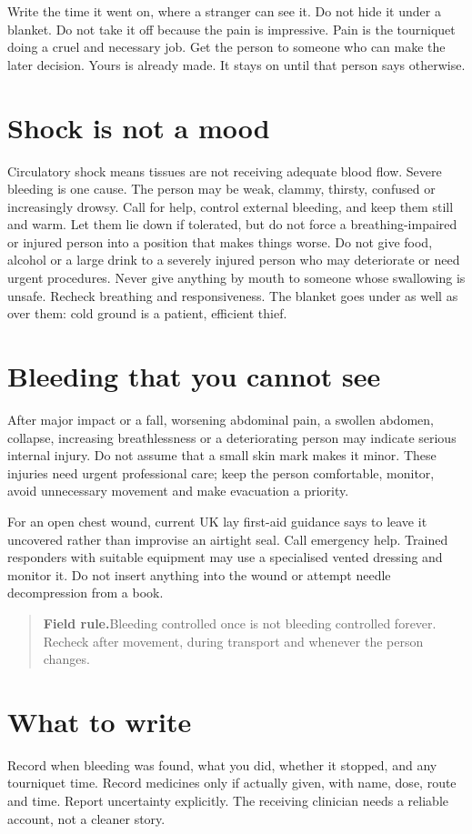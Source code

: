 \documentclass[10pt,openright]{book}
\newcommand{\fieldrule}[1]{\begin{quote}\textbf{Field rule.}\enspace #1\end{quote}}
\begin{document}
Write the time it went on, where a stranger can see it. Do not hide it under a blanket. Do not take it off because the pain is impressive. Pain is the tourniquet doing a cruel and necessary job. Get the person to someone who can make the later decision. Yours is already made. It stays on until that person says otherwise.

\section*{Shock is not a mood}
Circulatory shock means tissues are not receiving adequate blood flow. Severe bleeding is one cause. The person may be weak, clammy, thirsty, confused or increasingly drowsy. Call for help, control external bleeding, and keep them still and warm. Let them lie down if tolerated, but do not force a breathing-impaired or injured person into a position that makes things worse. Do not give food, alcohol or a large drink to a severely injured person who may deteriorate or need urgent procedures. Never give anything by mouth to someone whose swallowing is unsafe. Recheck breathing and responsiveness. The blanket goes under as well as over them: cold ground is a patient, efficient thief.

\section*{Bleeding that you cannot see}
After major impact or a fall, worsening abdominal pain, a swollen abdomen, collapse, increasing breathlessness or a deteriorating person may indicate serious internal injury. Do not assume that a small skin mark makes it minor. These injuries need urgent professional care; keep the person comfortable, monitor, avoid unnecessary movement and make evacuation a priority.

For an open chest wound, current UK lay first-aid guidance says to leave it uncovered rather than improvise an airtight seal. Call emergency help. Trained responders with suitable equipment may use a specialised vented dressing and monitor it. Do not insert anything into the wound or attempt needle decompression from a book.

\fieldrule{Bleeding controlled once is not bleeding controlled forever. Recheck after movement, during transport and whenever the person changes.}
\section*{What to write}
Record when bleeding was found, what you did, whether it stopped, and any tourniquet time. Record medicines only if actually given, with name, dose, route and time. Report uncertainty explicitly. The receiving clinician needs a reliable account, not a cleaner story.
\end{document}
